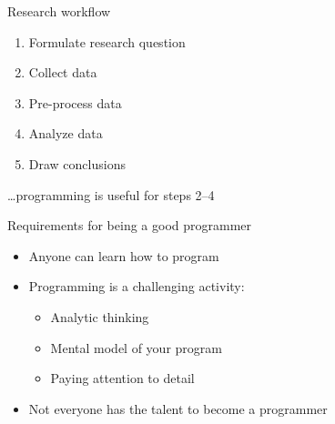\documentclass[aspectratio=169,usenames,dvipsnames]{beamer}
\begin{document}
\begin{frame}{Research workflow}
    \begin{enumerate}
        \item Formulate research question
        \item Collect data
        \item Pre-process data
        \item Analyze data
        \item Draw conclusions
    \end{enumerate}

    \pause
    \dots programming is useful for steps 2--4
\end{frame}

\begin{frame}{Requirements for being a good programmer}
    \begin{itemize}
        \item Anyone can learn how to program
        \item Programming is a challenging activity:
            \begin{itemize}
                \item Analytic thinking
                \item Mental model of your program
                \item Paying attention to detail
            \end{itemize}
        \item Not everyone has the talent to become
            a  programmer
    \end{itemize}
\end{frame}
\end{document}

